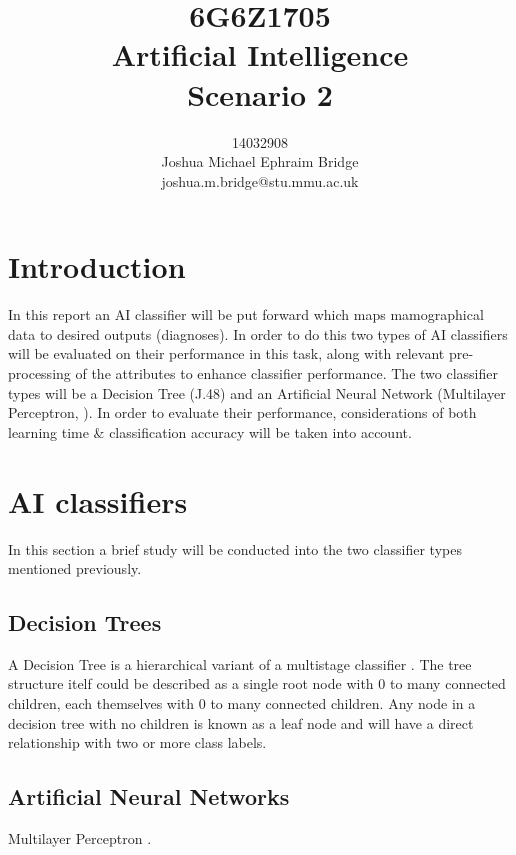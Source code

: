 \documentclass[12pt]{article}
\title{\vspace{2cm}6G6Z1705\\\textbf{Artificial Intelligence}\\\vspace{2cm}Scenario 2\\\vspace{2cm}}
\author{14032908\\Joshua Michael Ephraim Bridge\\joshua.m.bridge@stu.mmu.ac.uk\\\vspace{1cm}}
\begin{document}
\maketitle

\newpage

\doublespacing

\section{Introduction}
  In this report an AI classifier will be put forward which maps mamographical data to desired outputs (diagnoses). In order to do this two types of AI classifiers will be evaluated on their performance in this task, along with relevant pre-processing of the attributes to enhance classifier performance. The two classifier types will be a Decision Tree (J.48) and an Artificial Neural Network (Multilayer Perceptron, \cite{minsky2017perceptrons}). In order to evaluate their performance, considerations of both learning time \& classification accuracy will be taken into account.

\section{AI classifiers}
  In this section a brief study will be conducted into the two classifier types mentioned previously.

  \subsection{Decision Trees}
    A Decision Tree is a hierarchical variant of a multistage classifier \citep{safavian1991survey}. The tree structure itelf could be described as a single root node with 0 to many connected children, each themselves with 0 to many connected children. Any node in a decision tree with no children is known as a leaf node and will have a direct relationship with two or more class labels.


  \subsection{Artificial Neural Networks}
  Multilayer Perceptron \citep{minsky2017perceptrons}.
\end{document}
